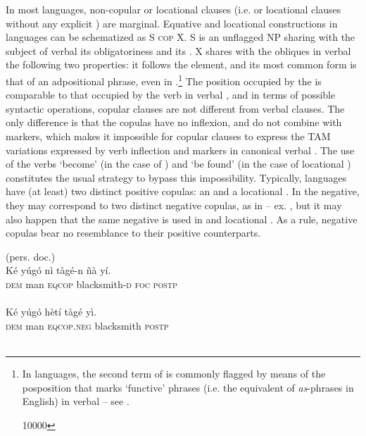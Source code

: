 \documentclass[output=paper]{langsci/langscibook}
\begin{document}
In most  languages, non-copular  or locational clauses (i.e.  or locational clauses without any explicit ) are marginal. Equative  and locational  constructions in  languages can be schematized as S \textsc{cop} X. S is an unflagged NP sharing with the subject of verbal  its obligatoriness and its . X shares with the obliques in verbal  the following two properties: it follows the  element, and its most common form is that of an adpositional phrase, even in .\footnote{In\largerpage {} languages, the second term of  is commonly flagged by means of the posposition that marks ‘functive’ phrases (i.e. the equivalent of \textit{as}{}-phrases in English) in verbal  – see \citet{Creissels2014}.{ 10000  \par}} The position occupied by the  is comparable to that occupied by the verb in  verbal , and in terms of possible syntactic operations, copular clauses are not different from  verbal clauses. The only difference is that the copulas have no inflexion, and do not combine with  markers, which makes it impossible for copular clauses to express the TAM variations expressed by verb inflection and  markers in canonical verbal . The use of the verbs ‘become’ (in the case of ) and ‘be found’ (in the case of locational ) constitutes the usual strategy to bypass this impossibility.
Typically,  languages have (at least) two distinct positive copulas: an  and a locational . In the negative, they may correspond to two distinct negative copulas, as in  – ex. , but it may also happen that the same negative  is used in  and locational . As a rule, negative copulas bear no resemblance to their positive counterparts.

\ea%
    \label{ex:creissels:4}    
    (pers. doc.)\\
   \ea
    \gll   Ké  yúgó  nì  tàgé-n  ñà  yí.\\
      \textsc{dem}  man  \textsc{eqcop}  blacksmith-\textsc{d}  \textsc{foc}   \textsc{postp} \\
      \\
   \ex
    \gll   Ké  yúgó  hètí  tàgé  yì. \\
      \textsc{dem}  man  \textsc{eqcop}.\textsc{neg}  blacksmith  \textsc{postp}\\
      \\
\end{document}
